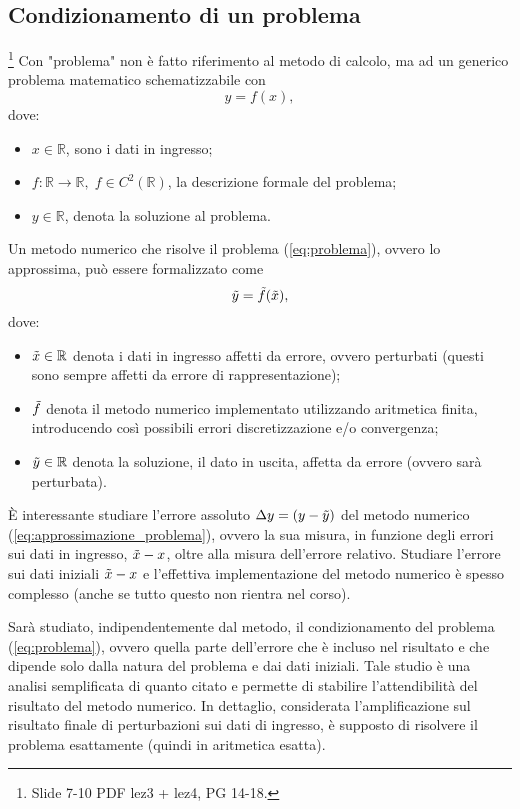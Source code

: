 \subsection{Condizionamento di un problema}\footnote{Slide 7-10 PDF lez3 + lez4, PG 14-18.}
Con "problema" non è fatto riferimento al metodo di calcolo, ma ad un generico problema matematico schematizzabile con 
\begin{equation}\label{eq:problema}
	y=f(x),
\end{equation}
dove:
\begin{itemize}
	\item $x\in\mathbb R$, sono i dati in ingresso;
	\item $f:\mathbb R\rightarrow\mathbb R,\; f\in C^2(\mathbb{R})$, la descrizione formale del problema;
	\item $y\in\mathbb R$, denota la soluzione al problema.
\end{itemize}

Un \gls{metodo numerico} che risolve il problema (\ref{eq:problema}), ovvero lo approssima, può essere formalizzato come
\begin{equation}\label{eq:approssimazione_problema}
	\Tilde{y}=\Tilde{f}(\Tilde{x}),
\end{equation}
dove:
\begin{itemize}
	\item $\Tilde{x}\in\mathbb R$ denota i dati in ingresso affetti da errore, ovvero perturbati (questi sono sempre affetti da errore di rappresentazione);
	\item $\Tilde{f}$ denota il \gls{metodo numerico} implementato utilizzando aritmetica finita, introducendo così possibili errori discretizzazione e/o convergenza;
	\item $\Tilde{y}\in\mathbb R$ denota la soluzione, il dato in uscita, affetta da errore (ovvero sarà perturbata). 
\end{itemize}

È interessante studiare l'errore assoluto $\Delta y = (y-\Tilde{y})$ del \gls{metodo numerico} (\ref{eq:approssimazione_problema}), ovvero la sua misura, in funzione degli errori sui dati in ingresso, $\Tilde{x} - x$, oltre alla misura dell'errore relativo. Studiare l'errore sui dati iniziali $\Tilde{x} - x$ e l'effettiva implementazione del \gls{metodo numerico} è spesso complesso (anche se tutto questo non rientra nel corso).

Sarà studiato, indipendentemente dal metodo, il condizionamento del problema (\ref{eq:problema}), ovvero quella parte dell'errore che è incluso nel risultato e che dipende solo dalla natura del problema e dai dati iniziali. Tale studio è una analisi semplificata di quanto citato e permette di stabilire l'attendibilità del risultato del \gls{metodo numerico}. In dettaglio, considerata l'amplificazione sul risultato finale di perturbazioni sui dati di ingresso, è supposto di risolvere il problema esattamente (quindi in aritmetica esatta).

